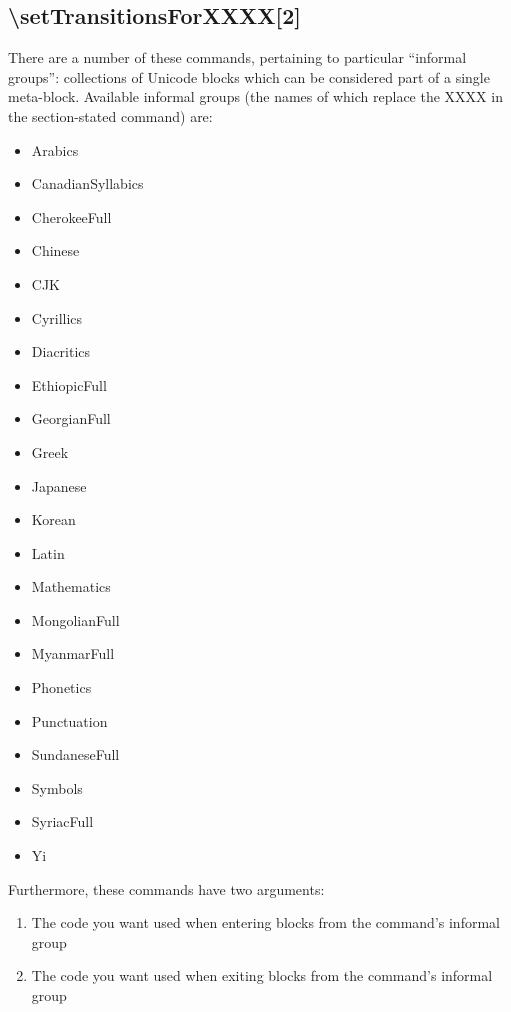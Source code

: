 \documentclass{article}
\newenvironment{itemlist}{%
  \begin{itemize}
  \setlength{\itemsep}{0pt}
  \setlength{\parsep}{0pt}
  \setlength{\topsep}{0pt}
  \setlength{\partopsep}{0pt}
  \setlength{\parskip}{0pt}
  \setlength{\labelsep}{5pt}}%
{
  \end{itemize}}
\newenvironment{numberlist}{%
  \begin{enumerate}
  \setlength{\itemsep}{0pt}
  \setlength{\parsep}{0pt}
  \setlength{\topsep}{0pt}
  \setlength{\partopsep}{0pt}
  \setlength{\parskip}{0pt}
  \setlength{\labelsep}{5pt}}%
{
  \end{enumerate}}
\begin{document}
    \subsection{\textbackslash setTransitionsForXXXX[2]}

      There are a number of these commands, pertaining to particular “informal groups”: collections of Unicode blocks which can be considered part of a single meta-block. Available informal groups (the names of which replace the XXXX in the section-stated command) are:

      \begin{itemlist}
        \item Arabics
        \item CanadianSyllabics
        \item CherokeeFull
        \item Chinese
        \item CJK
        \item Cyrillics
        \item Diacritics
        \item EthiopicFull
        \item GeorgianFull
        \item Greek
        \item Japanese
        \item Korean
        \item Latin
        \item Mathematics
        \item MongolianFull
        \item MyanmarFull
        \item Phonetics
        \item Punctuation
        \item SundaneseFull
        \item Symbols
        \item SyriacFull
        \item Yi
      \end{itemlist}

      Furthermore, these commands have two arguments:

      \begin{numberlist}
        \item The code you want used when entering blocks from the command's informal group
        \item The code you want used when exiting blocks from the command's informal group
      \end{numberlist}
\end{document}
